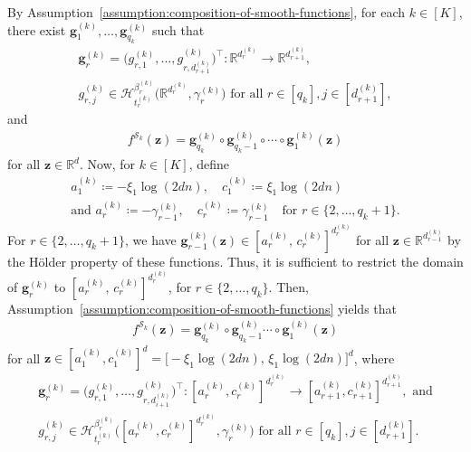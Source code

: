 \documentclass[12pt]{article}
\begin{document}
By Assumption~\ref{assumption:composition-of-smooth-functions}, for each $k\in[K]$, there exist $\bm g^{(k)}_{1}, \ldots, \bm g^{(k)}_{q_k}$ such that
\begin{gather*}
    \bm g^{(k)}_{r}=\bigl(g^{(k)}_{r,1}, \ldots, g^{(k)}_{r,d_{r+1}^{(k)}}\bigr)^\top : \mathbb{R}^{d_{r}^{(k)}} \to \mathbb{R}^{d_{r+1}^{(k)}}, \nonumber\\
    g_{r,j}^{(k)} \in \mathcal{H}_{t_{r}^{(k)}}^{\beta_{r}^{(k)}}\bigl(\mathbb{R}^{d^{(k)}_r}, \gamma^{(k)}_r\bigr) \text{ for all } r\in[q_k], j\in[d_{r+1}^{(k)}], 
\end{gather*}
and
\begin{align*}
    f^{\mathcal{S}_k}(\bm z) = \bm g^{(k)}_{q_k} \circ \bm g^{(k)}_{q_k-1} \circ \cdots \circ \bm g^{(k)}_{1}(\bm z)
\end{align*}
for all $\bm z\in \mathbb{R}^d$. Now, for $k \in [K]$, define 
\begin{gather}
    a_1^{(k)} \coloneqq -\xi_1\log(2dn),\quad c_1^{(k)} \coloneqq \xi_1\log(2dn)\nonumber\\
    \text{and } a_r^{(k)} \coloneqq -\gamma_{r-1}^{(k)},\quad c_r^{(k)} \coloneqq \gamma_{r-1}^{(k)} \quad\text{for } r\in\{2,\ldots,q_k+1\}. \label{eq:defn-a_r^(k)-c_r^(k)}
\end{gather}
For $r\in\{2,\ldots,q_k+1\}$, we have $\bm g_{r-1}^{(k)}(\bm{z}) \in [a_r^{(k)},\, c_r^{(k)}]^{d_r^{(k)}}$ for all $\bm{z} \in \mathbb{R}^{d^{(k)}_{r-1}}$ by the H\"older property of these functions. Thus, it is sufficient to restrict the domain of $\bm g_r^{(k)}$ to $[a_r^{(k)},\, c_r^{(k)}]^{d_r^{(k)}}$, for $r\in\{2,\ldots,q_k\}$. Then, Assumption~\ref{assumption:composition-of-smooth-functions} yields that
\begin{align*}
    f^{\mathcal{S}_k}(\bm z) = \bm g^{(k)}_{q_k} \circ \bm g^{(k)}_{q_k-1} \cdots \circ \bm g^{(k)}_{1}(\bm z)
\end{align*}
for all $\bm z\in [a_1^{(k)},c_1^{(k)}]^d = \bigl[-\xi_1\log(2dn),\,\xi_1\log(2dn)\bigr]^d$, where
\begin{gather}
    \bm g^{(k)}_{r}=\bigl(g^{(k)}_{r,1}, \ldots, g^{(k)}_{r,d_{i+1}^{(k)}}\bigr)^\top : [a_{r}^{(k)}, c_{r}^{(k)}]^{d_{r}^{(k)}} \to [a_{r+1}^{(k)}, c_{r+1}^{(k)}]^{d_{r+1}^{(k)}}, \text{ and} \nonumber\\
    g_{r,j}^{(k)} \in \mathcal{H}_{t_{r}^{(k)}}^{\beta_{r}^{(k)}}\bigl([a^{(k)}_r,c^{(k)}_r]^{d^{(k)}_r}, \gamma^{(k)}_r\bigr) \text{ for all } r\in[q_k], j\in[d_{r+1}^{(k)}]. \label{eq:defn-g_r^k}
\end{gather}
\end{document}
